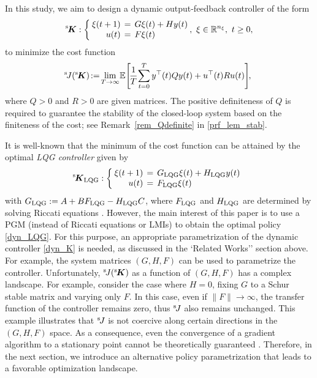 \documentclass[preprint,5p,times,twocolumn]{elsarticle}
\newcommand{\bm}[1]{{\mbox{\boldmath $#1$}}}
\def\rmsK{{}^{\rm s}\hspace{-0.4mm}}
\def\rmsJ{{}^{\rm s}\hspace{-0.5mm}}
\def\h{\hspace{-0.5mm}}
\def\H{\hspace{-1.0mm}}
\def\hH{\hspace{-1.5mm}}
\def\HH{\hspace{-2.0mm}}
\begin{document}
In this study, we aim to design a dynamic output-feedback controller of the form
\begin{equation}\label{dyn_K}
    \rmsK{\bm K} : \hspace{0pt}
\left\{\H
\begin{array}{rcl}
    \xi(t+1) \HH &=& \HH G \xi(t) + H y(t)\\
    u(t) \HH &=& \HH F \xi(t)
\end{array}
\right.\HH ,~ \xi \in \mathbb R^{n_{\xi}},~t \geq 0,
\end{equation}
to minimize the cost function
\begin{equation}\label{defJ_orig}
    \hH \rmsJ J(\rmsK {\bm K}) \h := \h \lim_{T \rightarrow \infty}\h \mathbb E \h
    \left[\h \frac{1}{T}\h \sum_{t = 0}^{T} y^{\top}(t)Qy(t) + u^{\top}(t)Ru(t)
    \right]\H ,
\end{equation}
where $Q > 0$ and $R > 0$ are given matrices. The positive definiteness of $Q$ is required to guarantee the stability of the closed-loop system based on the finiteness of the cost; see Remark~\ref{rem_Qdefinite} in \ref{prf_lem_stab}. 

It is well-known that the minimum of the cost function can be attained by the optimal {\it LQG controller} given by 
\begin{equation}\label{dyn_LQG}
    \rmsK {\bm K}_{\rm LQG} :
\left\{\H
\begin{array}{rcl}
    \xi(t+1) \HH &=&\HH  G_{\rm LQG} \xi(t) + H_{\rm LQG} y(t)\\
    u(t) \HH &=&\HH  F_{\rm LQG} \xi(t) 
\end{array}
\right.
\end{equation}
with $G_{\rm LQG} := A+BF_{\rm LQG}-H_{\rm LQG}C$, where $F_{\rm LQG}$ and $H_{\rm LQG}$ are determined by solving Riccati equations \cite{soderstrom2002discrete}. 
However, the main interest of this paper is to use a PGM (instead of Riccati equations or LMIs) to obtain the optimal policy \eqref{dyn_LQG}.
For this purpose, an appropriate parametrization of the dynamic controller \eqref{dyn_K} is needed, as discussed in the `Related Works'' section above. 
For example, the system matrices $(G,H,F)$ can be used to parametrize the controller. 
Unfortunately, $\rmsJ J(\rmsK {\bm K})$ as a function of $(G,H,F)$ has a complex landscape. For example, consider the case where $H = 0$, fixing $G$ to a Schur stable matrix and varying only $F$. In this case, even if $\|F\| \to \infty$, the transfer function of the controller remains zero, thus $\rmsJ J$ also remains unchanged. This example illustrates that $\rmsJ J$ is not coercive along certain directions in the $(G, H, F)$ space. As a consequence, even the convergence of a gradient algorithm to a stationary point cannot be theoretically guaranteed \cite{hu2023toward}. Therefore, in the next section, we introduce an alternative policy parametrization that leads to a favorable optimization landscape.
\end{document}
